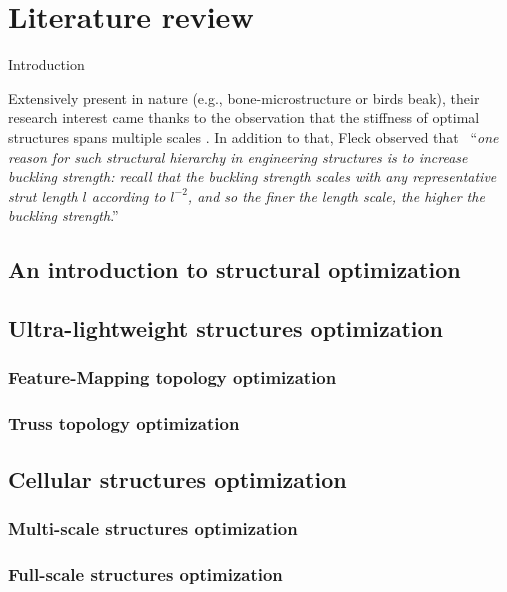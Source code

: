 \setchapterpreamble[u]{\margintoc}
\chapter{Literature review}
Introduction

Extensively present in nature (e.g., bone-microstructure or birds beak), their research interest came thanks to the observation that the stiffness of optimal structures spans multiple scales . In addition to that, Fleck observed that ~``\textit{one reason for such structural hierarchy in engineering structures is to increase buckling strength: recall that the buckling strength scales with any representative strut length $l$ according to $l^{-2}$, and so the finer the length scale, the higher the buckling strength}.''
\section{An introduction to structural optimization}

\section{Ultra-lightweight structures optimization}

\subsection{Feature-Mapping topology optimization}

\subsection{Truss topology optimization}

\section{Cellular structures optimization}

\subsection{Multi-scale structures optimization}

\subsection{Full-scale structures optimization}
